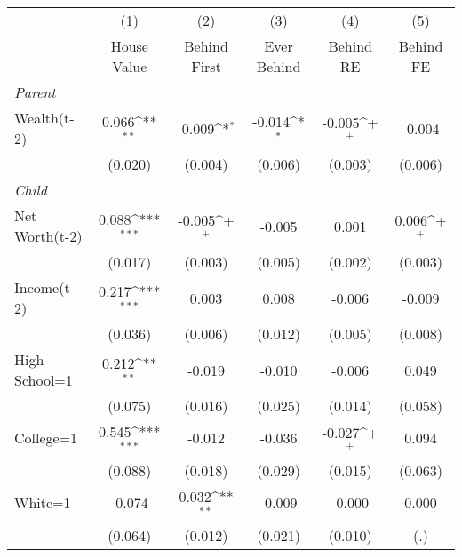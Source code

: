{
\def\sym#1{\ifmmode^{#1}\else\(^{#1}\)\fi}
\begin{tabular}{l*{5}{c}}
\toprule
                &\multicolumn{1}{c}{(1)}&\multicolumn{1}{c}{(2)}&\multicolumn{1}{c}{(3)}&\multicolumn{1}{c}{(4)}&\multicolumn{1}{c}{(5)}\\
                &\multicolumn{1}{c}{House Value}&\multicolumn{1}{c}{Behind First}&\multicolumn{1}{c}{Ever Behind}&\multicolumn{1}{c}{Behind RE}&\multicolumn{1}{c}{Behind FE}\\
\midrule
\textit{Parent} &                  &                  &                  &                  &                  \\
\;Wealth(t-2)   &    0.066\sym{**} &   -0.009\sym{*}  &   -0.014\sym{*}  &   -0.005\sym{+}  &   -0.004         \\
                &  (0.020)         &  (0.004)         &  (0.006)         &  (0.003)         &  (0.006)         \\
\textit{Child}  &                  &                  &                  &                  &                  \\
\;Net Worth(t-2)&    0.088\sym{***}&   -0.005\sym{+}  &   -0.005         &    0.001         &    0.006\sym{+}  \\
                &  (0.017)         &  (0.003)         &  (0.005)         &  (0.002)         &  (0.003)         \\
\;Income(t-2)   &    0.217\sym{***}&    0.003         &    0.008         &   -0.006         &   -0.009         \\
                &  (0.036)         &  (0.006)         &  (0.012)         &  (0.005)         &  (0.008)         \\
\;High School=1 &    0.212\sym{**} &   -0.019         &   -0.010         &   -0.006         &    0.049         \\
                &  (0.075)         &  (0.016)         &  (0.025)         &  (0.014)         &  (0.058)         \\
\;College=1     &    0.545\sym{***}&   -0.012         &   -0.036         &   -0.027\sym{+}  &    0.094         \\
                &  (0.088)         &  (0.018)         &  (0.029)         &  (0.015)         &  (0.063)         \\
\;White=1       &   -0.074         &    0.032\sym{**} &   -0.009         &   -0.000         &    0.000         \\
                &  (0.064)         &  (0.012)         &  (0.021)         &  (0.010)         &      (.)         \\

\end{tabular}}
